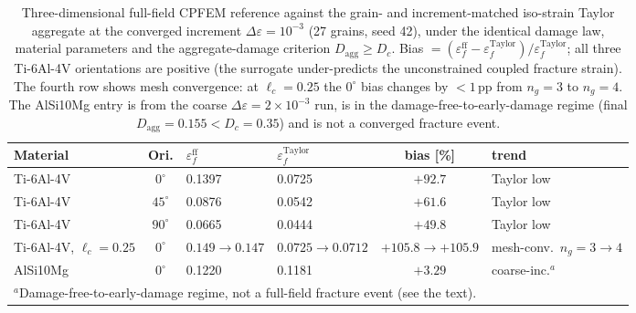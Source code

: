 \documentclass[12pt,a4paper,twocolumn]{article}
\providecommand{\ang}[1]{\ensuremath{#1^{\circ}}}
\begin{document}
\begin{table}[htbp]
\centering
\caption{Three-dimensional full-field CPFEM reference against the grain- and increment-matched
iso-strain Taylor aggregate at the converged increment $\Delta\varepsilon=10^{-3}$ (27 grains, seed 42),
under the identical damage law, material parameters and the aggregate-damage criterion
$D_{\mathrm{agg}}\ge D_c$. Bias $=(\varepsilon_f^{\mathrm{ff}} -
\varepsilon_f^{\mathrm{Taylor}})/\varepsilon_f^{\mathrm{Taylor}}$; all three Ti-6Al-4V orientations are
positive (the surrogate under-predicts the unconstrained coupled fracture strain). The fourth row shows
mesh convergence: at $\ell_c=0.25$ the $\ang{0}$ bias changes by $<1$\,pp from $n_g=3$ to $n_g=4$. The
AlSi10Mg entry is from the coarse $\Delta\varepsilon=2\times10^{-3}$ run, is in the
damage-free-to-early-damage regime (final $D_{\mathrm{agg}} = 0.155 < D_c = 0.35$) and is not a converged
fracture event.}
\label{tab:ff3d_orientations}
\footnotesize
\setlength{\tabcolsep}{4pt}
\begin{tabular}{p{}cp{}p{}cp{}}
\toprule
\textbf{Material} & \textbf{Ori.} & \textbf{$\varepsilon_f^{\mathrm{ff}}$} & \textbf{$\varepsilon_f^{\mathrm{Taylor}}$} & \textbf{bias [\%]} & \textbf{trend} \\
\midrule
Ti-6Al-4V & $\ang{0}$ & 0.1397 & 0.0725 & $+92.7$ & Taylor low \\
Ti-6Al-4V & $\ang{45}$ & 0.0876 & 0.0542 & $+61.6$ & Taylor low \\
Ti-6Al-4V & $\ang{90}$ & 0.0665 & 0.0444 & $+49.8$ & Taylor low \\
Ti-6Al-4V, $\ell_c{=}0.25$ & $\ang{0}$ & $0.149\to0.147$ & $0.0725\to0.0712$ & $+105.8\to+105.9$ & mesh-conv.\ $n_g{=}3\to4$ \\
AlSi10Mg & $\ang{0}$ & 0.1220 & 0.1181 & $+3.29$ & coarse-inc.$^{a}$ \\
\bottomrule
\multicolumn{6}{p{0.97\textwidth}}{\footnotesize $^{a}$Damage-free-to-early-damage regime, not a
full-field fracture event (see the text).}
\end{tabular}
\end{table}
\end{document}
